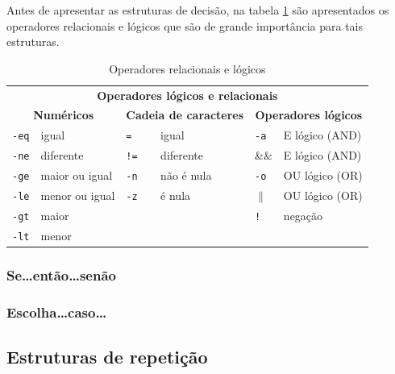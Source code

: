 \documentclass[11pt]{ifscarticle}
\begin{document}
Antes de apresentar as estruturas de decisão, na tabela \ref{tabelaoperadores} são apresentados os operadores relacionais e lógicos que são de grande importância para tais estruturas.

\begin{table}[!htpb]
    \centering
    \caption{Operadores relacionais e lógicos}\label{tabelaoperadores}
 
    \begin{tabular}{ll||ll||ll} \toprule
    \multicolumn{6}{c}{\textbf{Operadores lógicos e relacionais}} \\ 
    \multicolumn{2}{c}{\textbf{Numéricos}} & \multicolumn{2}{c}{\textbf{Cadeia de caracteres}} & \multicolumn{2}{c}{\textbf{Operadores lógicos}}\\ \midrule
    \texttt{-eq} & igual     & \texttt{=} & igual & \texttt{-a} & E lógico (AND) \\ \hline
    \texttt{-ne} & diferente & \texttt{!=} & diferente & \&\& & E lógico (AND)\\ \hline
    \texttt{-ge} & maior ou igual & \texttt{-n} & não é nula & \texttt{-o} & OU lógico (OR)\\ \hline
    \texttt{-le} & menor ou igual & \texttt{-z} & é nula & $\|$ & OU lógico (OR)\\ \hline
    \texttt{-gt} & maior &  & & \texttt{!} & negação \\ \hline
    \texttt{-lt} & menor &  &  & &\\ \bottomrule
    \end{tabular}
\end{table}


\subsubsection{Se\ldots então\ldots senão}






\subsubsection{Escolha\ldots caso\ldots}




\subsection{Estruturas de repetição}
\end{document}
